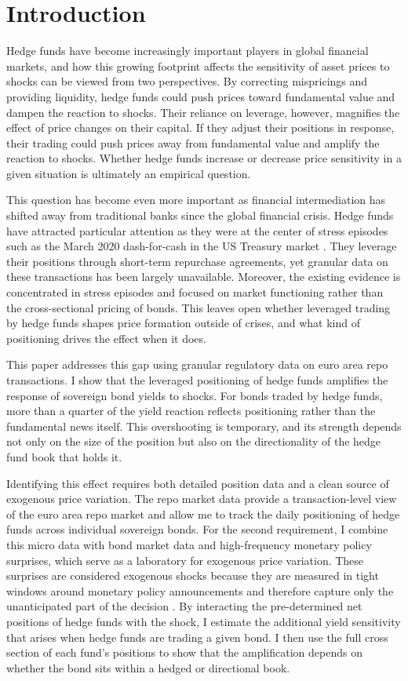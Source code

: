 \documentclass[english, 11pt, oneside]{article}
\begin{document}
\newpage 
\section{Introduction}
Hedge funds have become increasingly important players in global financial markets, and how this growing footprint affects the sensitivity of asset prices to shocks can be viewed from two perspectives. By correcting mispricings and providing liquidity, hedge funds could push prices toward fundamental value and dampen the reaction to shocks. Their reliance on leverage, however, magnifies the effect of price changes on their capital. If they adjust their positions in response, their trading could push prices away from fundamental value and amplify the reaction to shocks. Whether hedge funds increase or decrease price sensitivity in a given situation is ultimately an empirical question. 

This question has become even more important as financial intermediation has shifted away from traditional banks since the global financial crisis. Hedge funds have attracted particular attention as they were at the center of stress episodes such as the March 2020 dash-for-cash in the US Treasury market \citep{barth2025, kruttli2025, aramonte2023}. They leverage their positions through short-term repurchase agreements, yet granular data on these transactions has been largely unavailable. Moreover, the existing evidence is concentrated in stress episodes and focused on market functioning rather than the cross-sectional pricing of bonds. This leaves open whether leveraged trading by hedge funds shapes price formation outside of crises, and what kind of positioning drives the effect when it does.

This paper addresses this gap using granular regulatory data on euro area repo transactions. I show that the leveraged positioning of hedge funds amplifies the response of sovereign bond yields to shocks. For bonds traded by hedge funds, more than a quarter of the yield reaction reflects positioning rather than the fundamental news itself. This overshooting is temporary, and its strength depends not only on the size of the position but also on the directionality of the hedge fund book that holds it.

Identifying this effect requires both detailed position data and a clean source of exogenous price variation. The repo market data provide a transaction-level view of the euro area repo market and allow me to track the daily positioning of hedge funds across individual sovereign bonds. For the second requirement, I combine this micro data with bond market data and high-frequency monetary policy surprises, which serve as a laboratory for exogenous price variation. These surprises are considered exogenous shocks because they are measured in tight windows around monetary policy announcements and therefore capture only the unanticipated part of the decision \citep{altavilla2019, gurkaynak2005}. By interacting the pre-determined net positions of hedge funds with the shock, I estimate the additional yield sensitivity that arises when hedge funds are trading a given bond. I then use the full cross section of each fund's positions to show that the amplification depends on whether the bond sits within a hedged or directional book.
\end{document}
